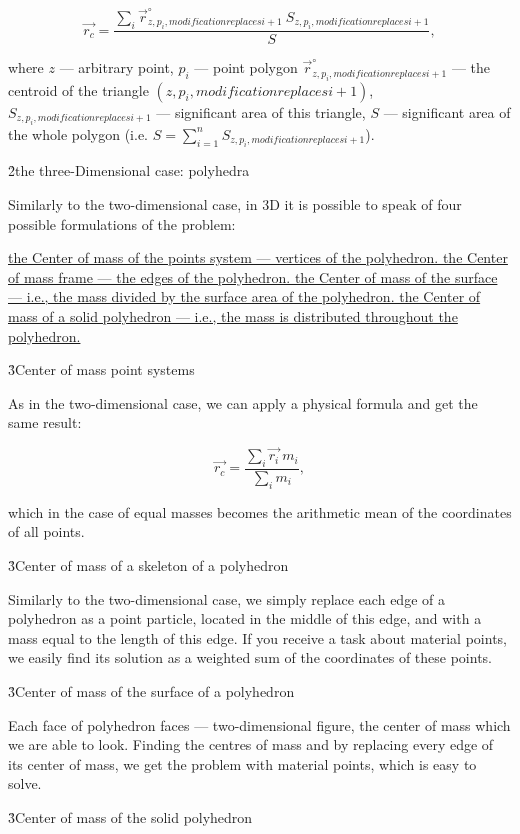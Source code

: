 $$ \vec{r_c} = \frac{ \sum\limits_i {\vec r}_{z,p_i,modification replaces{i+1}}^\circ ~ S_{z,p_i,modification replaces{i+1}} }{ S }, $$

where $z$ --- arbitrary point, $p_i$ --- point polygon ${\vec r}_{z,p_i,modification replaces{i+1}}^\circ$ --- the centroid of the triangle $(z,p_i,modification replaces{i+1})$, $S_{z,p_i,modification replaces{i+1}}$ --- significant area of this triangle, $S$ --- significant area of the whole polygon (i.e. $S = \sum_{i=1}^{n} S_{z,p_i,modification replaces{i+1}}$).


\h2{the three-Dimensional case: polyhedra}

Similarly to the two-dimensional case, in 3D it is possible to speak of four possible formulations of the problem:

\ul{
\li the Center of mass of the points system --- vertices of the polyhedron.
\li the Center of mass frame --- the edges of the polyhedron.
\li the Center of mass of the surface --- i.e., the mass divided by the surface area of the polyhedron.
\li the Center of mass of a solid polyhedron --- i.e., the mass is distributed throughout the polyhedron.
}


\h3{Center of mass point systems}

As in the two-dimensional case, we can apply a physical formula and get the same result:

$$ \vec{r_c} = \frac{ \sum\limits_i \vec{r_i} ~ m_i }{ \sum\limits_i m_i }, $$

which in the case of equal masses becomes the arithmetic mean of the coordinates of all points.


\h3{Center of mass of a skeleton of a polyhedron}

Similarly to the two-dimensional case, we simply replace each edge of a polyhedron as a point particle, located in the middle of this edge, and with a mass equal to the length of this edge. If you receive a task about material points, we easily find its solution as a weighted sum of the coordinates of these points.


\h3{Center of mass of the surface of a polyhedron}

Each face of polyhedron faces --- two-dimensional figure, the center of mass which we are able to look. Finding the centres of mass and by replacing every edge of its center of mass, we get the problem with material points, which is easy to solve.


\h3{Center of mass of the solid polyhedron}

